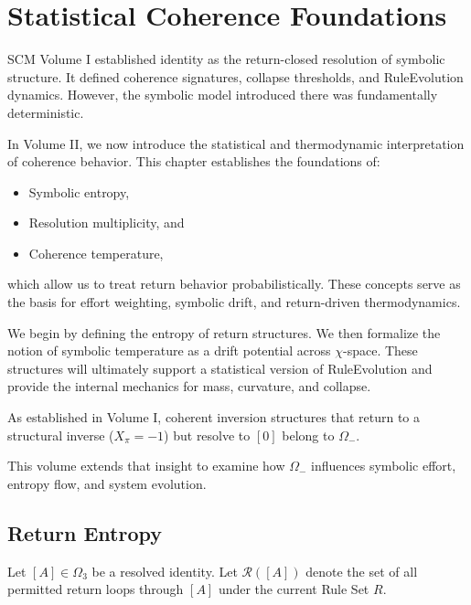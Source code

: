 
\chapter{Statistical Coherence Foundations} \label{chapter-1-statistical-coherence-foundations}

SCM Volume I established identity as the return-closed resolution of symbolic structure. It defined coherence signatures, collapse thresholds, and RuleEvolution dynamics. However, the symbolic model introduced there was fundamentally deterministic.

In Volume II, we now introduce the statistical and thermodynamic interpretation of coherence behavior. This chapter establishes the foundations of:

\begin{itemize}
    \item Symbolic entropy,
    \item Resolution multiplicity, and
    \item Coherence temperature,
\end{itemize}

which allow us to treat return behavior probabilistically. These concepts serve as the basis for effort weighting, symbolic drift, and return-driven thermodynamics.

We begin by defining the entropy of return structures. We then formalize the notion of symbolic temperature as a drift potential across $\chi$-space. These structures will ultimately support a statistical version of RuleEvolution and provide the internal mechanics for mass, curvature, and collapse.

\medskip

As established in Volume I, coherent inversion structures that return to a structural inverse ($X_\pi = -1$) but resolve to $[0]$ belong to $\Omega_-$.

This volume extends that insight to examine how $\Omega_-$ influences symbolic effort, entropy flow, and system evolution.

\section{Return Entropy} \label{return-entropy}

Let $[A] \in \Omega_3$ be a resolved identity. Let $\mathcal{R}([A])$ denote the set of all permitted return loops through $[A]$ under the current Rule Set $R$.

